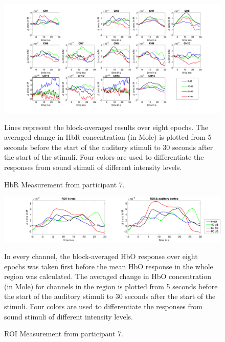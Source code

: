 \begin{figure}[H]
  \centering
    \includegraphics[scale=.4]{bilder/HbR_Mole/sub_liao_s_HbR.png}
  \caption{HbR Measurement from participant 7.}
  \label{fig:hbr7}
  \medskip
  \footnotesize {Lines represent the block-averaged results over eight epochs. The averaged change in HbR concentration (in Mole) is plotted from 5 seconds before the start of the auditory stimuli to 30 seconds after the start of the stimuli. Four colors are used to differentiate the responses from sound stimuli of different intensity levels.}
\end{figure}

\begin{figure}[H]
  \centering
    \includegraphics[scale=.29]{bilder/ROI/sub_liao_s_HbO.png}
  \caption{ROI Measurement from participant 7.}
  \label{fig:roi7}
  \medskip
  \footnotesize {In every channel, the block-averaged HbO response over eight epochs was taken first before the mean HbO response in the whole region was calculated. The averaged change in HbO concentration (in Mole) for channels in the region is plotted from 5 seconds before the start of the auditory stimuli to 30 seconds after the start of the stimuli. Four colors are used to differentiate the responses from sound stimuli of different intensity levels.}
\end{figure}



\newpage









